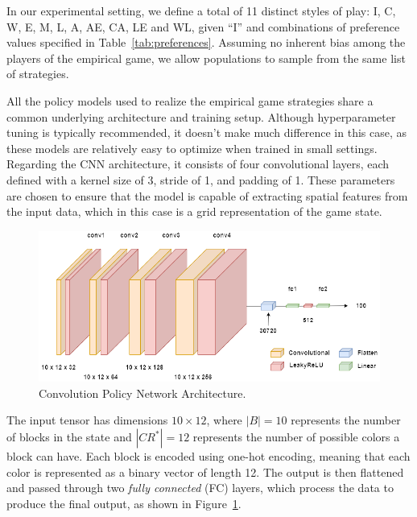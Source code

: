         \noindent
        In our experimental setting, we define a total of 11 distinct styles of play: I, C, W, E, M, L, A, AE, CA, LE and WL, given ``I'' and combinations of preference values specified in Table~\ref{tab:preferences}. Assuming no inherent bias among the players of the empirical game, we allow populations to sample from the same list of strategies.\tinydouble

        \noindent
        All the policy models used to realize the empirical game strategies share a common underlying architecture and training setup. Although hyperparameter tuning is typically recommended, it doesn't make much difference in this case, as these models are relatively easy to optimize when trained in small settings. Regarding the CNN architecture, it consists of four convolutional layers, each defined with a kernel size of 3, stride of 1, and padding of 1. These parameters are chosen to ensure that the model is capable of extracting spatial features from the input data, which in this case is a grid representation of the game state. 
        \begin{figure}[H]
            \centering
            \includegraphics[width=0.9\linewidth]{images/convDQN.png}
            \caption{Convolution Policy Network Architecture.}
            \label{fig:convDQN}
        \end{figure}
        
        \noindent
        The input tensor has dimensions $10 \times 12$, where $|B|=10$ represents the number of blocks in the state and $|CR^*|=12$ represents the number of possible colors a block can have. Each block is encoded using one-hot encoding, meaning that each color is represented as a binary vector of length 12. The output is then flattened and passed through two \emph{fully connected} (FC) layers, which process the data to produce the final output, as shown in Figure~\ref{fig:convDQN}.\tinydouble

